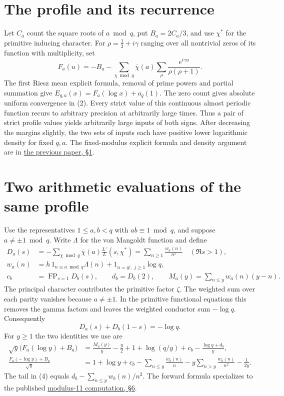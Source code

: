 \documentclass[11pt,a4paper]{article}
\newcommand{\FP}{\operatorname{FP}}
\newcommand{\kb}{\overline{\chi}}
\newcommand{\head}[1]{\section*{\color{ink}#1}}
\begin{document}
\head{The profile and its recurrence}
Let \(C_a\) count the square roots of \(a\bmod q\), put \(B_a=2C_a/3\), and use
\(\chi^*\) for the primitive inducing character. For \(\rho=\tfrac12+i\gamma\)
ranging over all nontrivial zeros of its function with multiplicity, set
\begin{equation}
 F_a(u)=-B_a-\sum_{\chi\bmod q}\kb(a)\sum_{\rho}
           \frac{e^{i\gamma u}}{\rho(\rho+1)} .
\end{equation}
The first Riesz mean explicit formula, removal of prime powers and partial summation
give \(E_{q,a}(x)=F_a(\log x)+o_q(1)\).
The zero count gives absolute uniform convergence in (2). Every strict value of
this continuous almost periodic function recurs to arbitrary precision at arbitrarily
large times. Thus a pair of strict profile values yields arbitrarily large inputs
of both signs. After decreasing the margins slightly, the two sets of inputs each
have positive lower logarithmic density for fixed \(q,a\). The fixed-modulus
explicit formula and density argument are in
\href{https://github.com/leecrossley/integrated-prime-errors-mod-11/blob/v2.0.0/range/PROOF.md}{the previous paper, \S1}.

\newpage
\head{Two arithmetic evaluations of the same profile}
Use the representatives \(1\le a,b<q\) with \(ab\equiv1\bmod q\), and suppose
\(a\ne\pm1\bmod q\). Write \(\Lambda\) for the von Mangoldt function and define
\[
 \begin{aligned}
 D_a(s)&=-\sum_{\chi\bmod q}\kb(a)\frac{L'}{L}(s,\chi^*)
             =\sum_{n\ge1}\frac{w_a(n)}{n^s}\quad(\Re s>1),\\
 w_a(n)&=h\,1_{n\equiv a\bmod q}\Lambda(n)+1_{n=q^j,\;j\ge1}\log q,\\
 c_b&=\FP_{s=1}D_b(s),\qquad d_b=D_b(2),\qquad
 M_a(y)=\sum_{n\le y}w_a(n)(y-n).
 \end{aligned}
\]
The principal character contributes the primitive factor \(\zeta\).
The weighted sum over each parity vanishes because \(a\ne\pm1\).
In the primitive functional equations this removes the gamma factors and leaves
the weighted conductor sum \(-\log q\). Consequently
\[
                 D_a(s)+D_b(1-s)=-\log q.
\]
For \(y\ge1\) the two identities we use are
\begin{align}
 \sqrt y\bigl(F_a(\log y)+B_a\bigr)
    &=\frac{M_a(y)}y-\frac y2+1+\log(q/y)+c_b-\frac{\log q+d_b}{y},\\
 \frac{F_a(-\log y)+B_a}{\sqrt y}
    &=1+\log y+c_b-\sum_{n\le y}\frac{w_b(n)}n
                    -y\sum_{n>y}\frac{w_b(n)}{n^2}-\frac1{2y}.
\end{align}
The tail in (4) equals \(d_b-\sum_{n\le y}w_b(n)/n^2\).
The forward formula specializes to the published
\href{https://github.com/leecrossley/integrated-prime-errors-mod-11/blob/v2.0.0/PROOF.md}{modulus-11 computation, \S6}.
\end{document}
